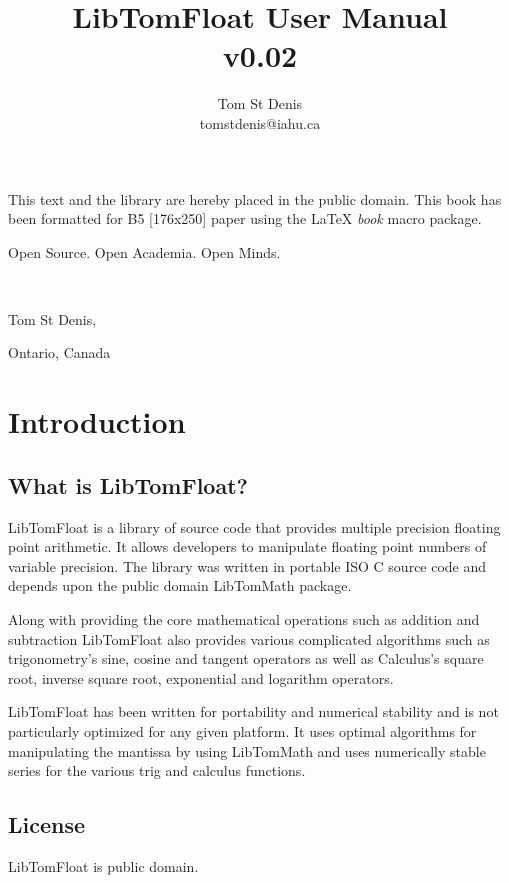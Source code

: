\documentclass[b5paper]{book}
\begin{document}
\frontmatter
\pagestyle{empty}
\title{LibTomFloat User Manual \\ v0.02}
\author{Tom St Denis \\ tomstdenis@iahu.ca}
\maketitle
This text and the library are hereby placed in the public domain.  This book has been formatted for B5 [176x250] paper using the \LaTeX{} {\em book} 
macro package.

\vspace{10cm}

\begin{flushright}Open Source.  Open Academia.  Open Minds.

\mbox{ }

Tom St Denis,

Ontario, Canada
\end{flushright}

\tableofcontents
\listoffigures
\mainmatter
\pagestyle{headings}
\chapter{Introduction}
\section{What is LibTomFloat?}
LibTomFloat is a library of source code that provides multiple precision floating point arithmetic.  It allows developers to manipulate floating
point numbers of variable precision.  The library was written in portable ISO C source code and depends upon the public domain
LibTomMath package.

Along with providing the core mathematical operations such as addition and subtraction LibTomFloat also provides various complicated algorithms
such as trigonometry's sine, cosine and tangent operators as well as Calculus's square root, inverse square root, exponential and logarithm
operators.  

LibTomFloat has been written for portability and numerical stability and is not particularly optimized for any given platform.  It uses optimal
algorithms for manipulating the mantissa by using LibTomMath and uses numerically stable series for the various trig and calculus functions.

\section{License}
LibTomFloat is public domain.
\end{document}
